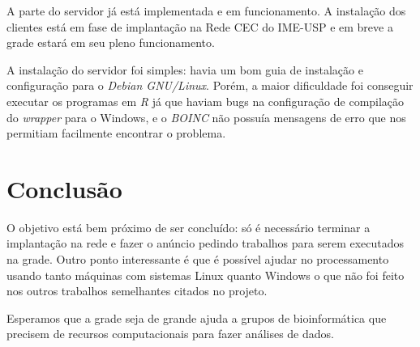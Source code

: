 \documentclass[b1]{sciposter}
\begin{document}
\begin{multicols}{2}
A parte do servidor já está implementada e em funcionamento. A instalação
dos clientes está em fase de implantação na Rede CEC do IME-USP e em breve 
a grade estará em seu pleno funcionamento.

A instalação do servidor foi simples: havia um bom guia de instalação e configuração
para o \textit{Debian GNU/Linux}. Porém, a maior dificuldade foi conseguir executar os programas em 
\textit{R} já que haviam bugs na configuração de compilação do \textit{wrapper} para o Windows, e o 
\textit{BOINC} não possuía mensagens de erro que nos permitiam facilmente encontrar o problema. 

\section{Conclusão}
 
O objetivo está bem próximo de ser concluído: só é necessário terminar a implantação
na rede e fazer o anúncio pedindo trabalhos para serem executados na grade. Outro ponto
interessante é que é possível ajudar no processamento usando tanto máquinas com sistemas
Linux quanto Windows o que não foi feito nos outros trabalhos semelhantes citados no projeto.  

Esperamos que a grade seja de grande ajuda a grupos de bioinformática que precisem de recursos
computacionais para fazer análises de dados. 
 






\end{multicols}
\end{document}
